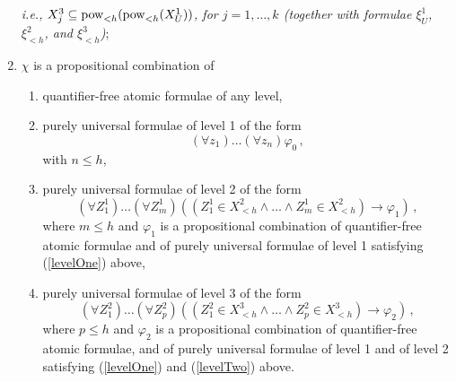 \documentclass{fundam}
\newcommand{\pow}{\mbox{\rm pow}}
\newcommand{\QLQSR}{\ensuremath{\mbox{$4\mathit{LQS}^{R}$}}\xspace}
\begin{document}
\begin{definition}[$(\QLQSR)^h$-formulae]
\begin{enumerate}
\emph{i.e., $X_j^3 \subseteq \pow_{< h}(\pow_{< h}(X_U^1))$, for $j =
1,\ldots,k$ (together with formulae $\xi_U^1$, $\xi_{< h}^2$, and
$\xi_{< h}^3$)};

\item $\chi$ is a propositional combination of
\begin{enumerate}
    \item quantifier-free atomic formulae of any level,

    \item\label{levelOne} purely universal formulae of level 1 of the form
    \[
    (\forall
    z_1)\ldots(\forall z_n)\varphi_0\,,
    \]
    with $n \leq h$,

    \item\label{levelTwo} purely universal formulae of level 2 of the form
    \[
    (\forall
    Z_1^1)\ldots (\forall Z_m^1)((Z_1^1 \in X_{< h}^2 \wedge \ldots
    \wedge Z_m^1 \in X_{< h}^2) \rightarrow \varphi_1)\,,
    \]
    where $m \leq h$ and $\varphi_1$ is a propositional combination of
    quantifier-free atomic formulae and of purely universal formulae
    of level 1 satisfying (\ref{levelOne}) above,

    \item purely universal formulae of level 3 of the form
    \[
    (\forall
    Z_1^2)\ldots (\forall Z_p^2)((Z_1^2 \in X_{< h}^3 \wedge \ldots
    \wedge Z_p^2 \in X_{< h}^3) \rightarrow \varphi_2)\,,
    \]
    where $p \leq h$ and $\varphi_2$ is a propositional combination of
    quantifier-free atomic formulae, and of purely universal formulae
    of level 1 and of level 2 satisfying (\ref{levelOne}) and
    (\ref{levelTwo}) above.
\end{enumerate}
\end{enumerate}

\end{definition}
\end{document}
